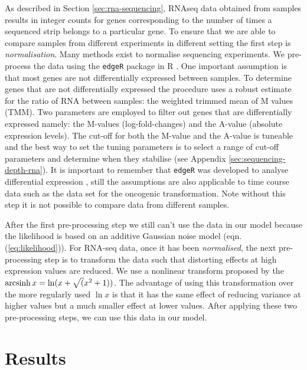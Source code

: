 As described in Section \ref{sec:rna-sequencing}, RNAseq data obtained from samples results in integer counts for genes corresponding to the number of times a sequenced strip belongs to a particular gene. To ensure that we are able to compare samples from different experiments in different setting the first step is \emph{normalisation}. Many methods exist to normalise sequencing experiments. We pre-process the data using the \texttt{edgeR} package in R \citep{McCarthy:2012wg,Robinson:2010cw}. One important assumption is that most genes are not differentially expressed between samples. To determine genes that are not differentially expressed the procedure uses a robust estimate for the ratio of RNA between samples: the weighted trimmed mean of M values (TMM). Two parameters are employed to filter out genes that are differentially expressed namely: the M-values (log-fold-changes) and the A-value (absolute expression levels). The cut-off for both the M-value and the A-value is tuneable and the best way to set the tuning parameters is to select a range of cut-off parameters and determine when they stabilise (see Appendix \ref{sec:sequencing-depth-rna}). It is important to remember that \texttt{edgeR} was developed to analyse differential expression \citep{Robinson:2010dd}, still the assumptions are also applicable to time course data such as the data set for the oncogenic transformation. Note without this step it is not possible to compare data from different samples.

After the first pre-processing step we still can't use the data in our model because the likelihood is based on an additive Gaussian noise model (eqn. (\ref{eq:likelihood})). For RNA-seq data, once it has been \emph{normalised}, the next pre-processing step is to transform the data such that distorting effects at high expression values are reduced. We use a nonlinear transform proposed by \cite{Hoffman:2012gn} the $\operatorname{arcsinh} x = \ln(x + \sqrt (x^2 + 1))$. The advantage of using this transformation over the more regularly used $\ln x$ is that it has the same effect of reducing variance at higher values but a much smaller effect at lower values. After applying these two pre-processing steps, we can use this data in our model.

\section{Results}
\label{sec:results-mcf10a}

